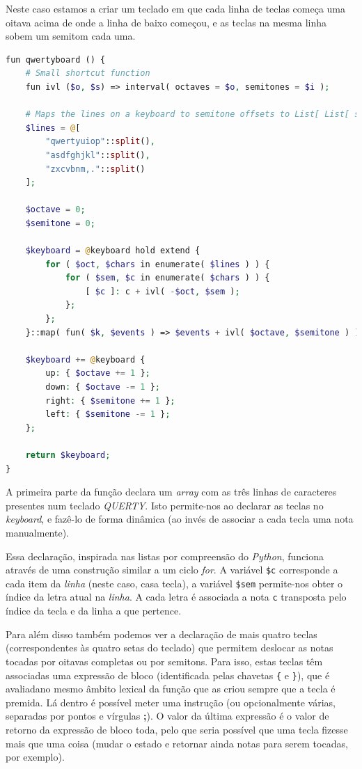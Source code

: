 Neste caso estamos a criar um teclado em que cada linha de teclas começa uma oitava acima de onde a linha de baixo começou, e as teclas na mesma linha sobem um semitom cada uma.
\begin{lstlisting}[caption=Exemplo de criação de um teclado de forma dinâmica,language=PHP]
fun qwertyboard () {
    # Small shortcut function
    fun ivl ($o, $s) => interval( octaves = $o, semitones = $i );

    # Maps the lines on a keyboard to semitone offsets to List[ List[ str ] ]
    $lines = @[
        "qwertyuiop"::split(),
        "asdfghjkl"::split(),
        "zxcvbnm,."::split()
    ];
    
    $octave = 0;
    $semitone = 0;
    
    $keyboard = @keyboard hold extend {
        for ( $oct, $chars in enumerate( $lines ) ) {
            for ( $sem, $c in enumerate( $chars ) ) {
                [ $c ]: c + ivl( -$oct, $sem );
            };
        };
    }::map( fun( $k, $events ) => $events + ivl( $octave, $semitone ) );
    
    $keyboard += @keyboard {
        up: { $octave += 1 };
        down: { $octave -= 1 };
        right: { $semitone += 1 };
        left: { $semitone -= 1 };
    };
    
    return $keyboard;
}
\end{lstlisting}
A primeira parte da função declara um \textit{array} com as três linhas de caracteres presentes num teclado \textit{QUERTY}. Isto permite-nos ao declarar as teclas no \textit{keyboard}, e fazê-lo de forma dinâmica (ao invés de associar a cada tecla uma nota manualmente).

Essa declaração, inspirada nas listas por compreensão do \textit{Python}, funciona através de uma construção similar a um ciclo \textit{for}. A variável \texttt{\$c} corresponde a cada item da \textit{linha} (neste caso, casa tecla), a variável \texttt{\$sem} permite-nos obter o índice da letra atual na \textit{linha}. A cada letra é associada a nota \texttt{c} transposta pelo índice da tecla e da linha a que pertence.

Para além disso também podemos ver a declaração de mais quatro teclas (correspondentes às quatro setas do teclado) que permitem deslocar as notas tocadas por oitavas completas ou por semitons. Para isso, estas teclas têm associadas uma expressão de bloco (identificada pelas chavetas \texttt{\{} e \texttt{\}}), que é avaliadano mesmo âmbito lexical da função que as criou sempre que a tecla é premida. Lá dentro é possível meter uma instrução (ou opcionalmente várias, separadas por pontos e vírgulas \textbf{;}). O valor da última expressão é o valor de retorno da expressão de bloco toda, pelo que seria possível que uma tecla fizesse mais que uma coisa (mudar o estado e retornar ainda notas para serem tocadas, por exemplo).

